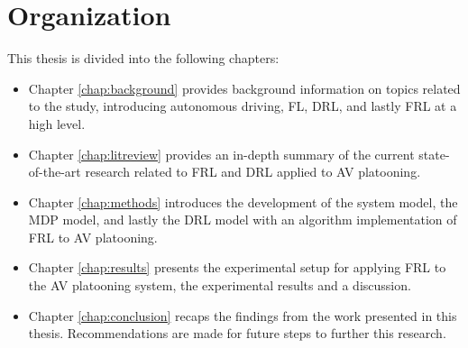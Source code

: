 \section{Organization}
This thesis is divided into the following chapters:

\begin{itemize}
    \item Chapter \ref{chap:background} provides background information on 
    topics related to the study, introducing autonomous driving, FL, DRL, 
    and lastly FRL at a high level.
    \vspace{12pt}
    \item Chapter \ref{chap:litreview} provides an in-depth summary of 
    the current state-of-the-art research related to FRL and DRL applied 
    to AV platooning. 
    \vspace{12pt}
    \item Chapter \ref{chap:methods} introduces the development of the 
    system model, the MDP model, and lastly the DRL model with an 
    algorithm implementation of FRL to AV platooning.
    \vspace{12pt}
    \item Chapter \ref{chap:results} presents the experimental 
    setup for applying FRL to the AV platooning system, the 
    experimental results and a discussion. 
    \vspace{12pt}
    \item Chapter \ref{chap:conclusion} recaps the findings 
    from the work presented in this thesis. Recommendations 
    are made for future steps to further this research.
\end{itemize}

